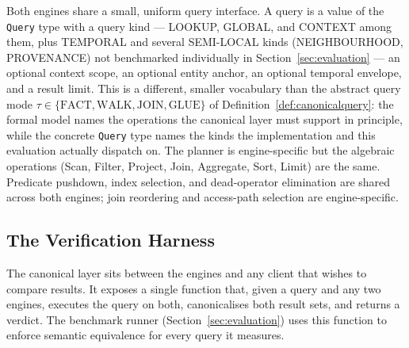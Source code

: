 Both engines share a small, uniform query interface. A query is a value of
the \texttt{Query} type with a query kind --- LOOKUP, GLOBAL, and CONTEXT
among them, plus TEMPORAL and several SEMI-LOCAL kinds
(NEIGHBOURHOOD, PROVENANCE) not benchmarked individually in
Section~\ref{sec:evaluation} --- an optional context scope, an optional entity anchor, an optional
temporal envelope, and a result limit. This is a different, smaller vocabulary
than the abstract query mode $\tau \in \{\text{FACT}, \text{WALK}, \text{JOIN},
\text{GLUE}\}$ of Definition~\ref{def:canonicalquery}: the formal model
names the operations the canonical layer must support in principle, while
the concrete \texttt{Query} type names the kinds the implementation and this
evaluation actually dispatch on. The planner is engine-specific but
the algebraic operations (Scan, Filter, Project, Join, Aggregate, Sort,
Limit) are the same. Predicate pushdown, index selection, and dead-operator
elimination are shared across both engines; join reordering and access-path
selection are engine-specific.

\subsection{The Verification Harness}
\label{sec:arch:verify}

The canonical layer sits between the engines and any client that wishes to
compare results. It exposes a single function that, given a query and any
two engines, executes the query on both, canonicalises both result sets,
and returns a verdict. The benchmark runner (Section~\ref{sec:evaluation})
uses this function to enforce semantic equivalence for every query it
measures.

